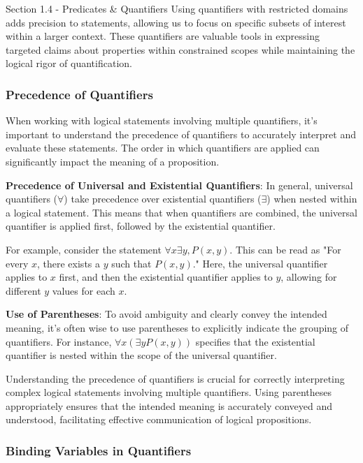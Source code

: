 \begin{notes}{Section 1.4 - Predicates \& Quantifiers}
    Using quantifiers with restricted domains adds precision to statements, allowing us to focus on specific subsets of interest within a larger context. These quantifiers are valuable tools in expressing targeted claims about properties within constrained 
    scopes while maintaining the logical rigor of quantification.
    
    \subsubsection*{Precedence of Quantifiers}

    When working with logical statements involving multiple quantifiers, it's important to understand the precedence of quantifiers to accurately interpret and evaluate these statements. The order in which quantifiers are applied can significantly impact the 
    meaning of a proposition.

    \textbf{Precedence of Universal and Existential Quantifiers}: In general, universal quantifiers (\(\forall\)) take precedence over existential quantifiers (\(\exists\)) when nested within a logical statement. This means that when quantifiers are combined, 
    the universal quantifier is applied first, followed by the existential quantifier.

    For example, consider the statement \(\forall x \exists y, P(x, y)\). This can be read as "For every \(x\), there exists a \(y\) such that \(P(x, y)\)." Here, the universal quantifier applies to \(x\) first, and then the existential quantifier applies to 
    \(y\), allowing for different \(y\) values for each \(x\).

    \textbf{Use of Parentheses}: To avoid ambiguity and clearly convey the intended meaning, it's often wise to use parentheses to explicitly indicate the grouping of quantifiers. For instance, \(\forall x (\exists y P(x, y))\) specifies that the existential 
    quantifier is nested within the scope of the universal quantifier.

    Understanding the precedence of quantifiers is crucial for correctly interpreting complex logical statements involving multiple quantifiers. Using parentheses appropriately ensures that the intended meaning is accurately conveyed and understood, 
    facilitating effective communication of logical propositions.

    \subsubsection*{Binding Variables in Quantifiers}


\end{notes}
